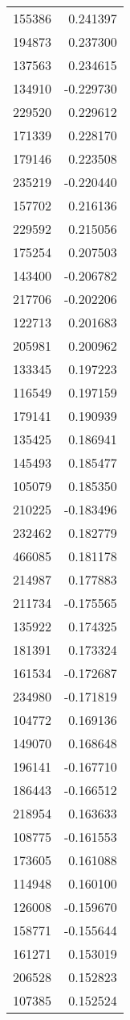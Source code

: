 \begin{tabular}{lr}
155386 & 0.241397 \\
194873 & 0.237300 \\
137563 & 0.234615 \\
134910 & -0.229730 \\
229520 & 0.229612 \\
171339 & 0.228170 \\
179146 & 0.223508 \\
235219 & -0.220440 \\
157702 & 0.216136 \\
229592 & 0.215056 \\
175254 & 0.207503 \\
143400 & -0.206782 \\
217706 & -0.202206 \\
122713 & 0.201683 \\
205981 & 0.200962 \\
133345 & 0.197223 \\
116549 & 0.197159 \\
179141 & 0.190939 \\
135425 & 0.186941 \\
145493 & 0.185477 \\
105079 & 0.185350 \\
210225 & -0.183496 \\
232462 & 0.182779 \\
466085 & 0.181178 \\
214987 & 0.177883 \\
211734 & -0.175565 \\
135922 & 0.174325 \\
181391 & 0.173324 \\
161534 & -0.172687 \\
234980 & -0.171819 \\
104772 & 0.169136 \\
149070 & 0.168648 \\
196141 & -0.167710 \\
186443 & -0.166512 \\
218954 & 0.163633 \\
108775 & -0.161553 \\
173605 & 0.161088 \\
114948 & 0.160100 \\
126008 & -0.159670 \\
158771 & -0.155644 \\
161271 & 0.153019 \\
206528 & 0.152823 \\
107385 & 0.152524 \\

\end{tabular}
